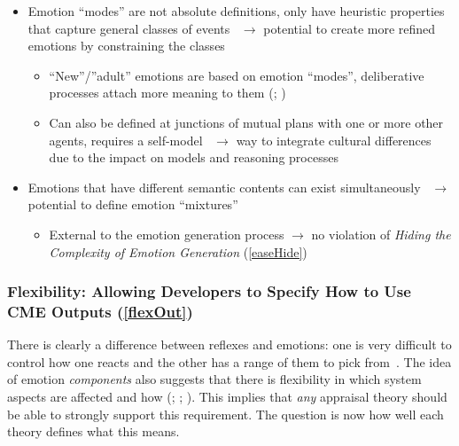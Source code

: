 \begin{itemize}
\begin{itemize}
        \item Emotion ``modes'' are not absolute definitions, only have
        heuristic properties that capture general classes of
        events~\citep[p.~87]{oatley2000sentiments} $\rightarrow$ potential to
        create more refined emotions by constraining the classes
        \begin{itemize}
            \item ``New''/''adult'' emotions are based on emotion ``modes'',
            deliberative processes attach more meaning to them
            (;
            )

            \item Can also be defined at junctions of mutual plans with one or
            more other agents, requires a self-model~\citep[p.~44, 46,
            48]{oatley1987towards} $\rightarrow$ way to integrate cultural
            differences due to the impact on models and reasoning
            processes~\citep[p.~47]{oatley1987towards}
        \end{itemize}

        \item Emotions that have different semantic contents can exist
        simultaneously~\citep[p.~104]{oatley1992best} $\rightarrow$ potential
        to define emotion ``mixtures''
        \begin{itemize}
            \item External to the emotion generation process $\rightarrow$ no
            violation of \textit{Hiding the Complexity of Emotion Generation}
            (\ref{easeHide})
        \end{itemize}
    \end{itemize}
\end{itemize}

\subsubsection{Flexibility: Allowing Developers to Specify How to Use CME
Outputs
    (\ref{flexOut})}
There is clearly a difference between reflexes and emotions: one is very
difficult to control how one reacts and the other has a range of them to pick
from~\citep[p.~45]{fellous2004human}. The idea of emotion \textit{components}
also suggests that there is flexibility in which system aspects are affected
and how (;
; ). This
implies that \textit{any} appraisal theory should be able to strongly support
this requirement. The question is now how well each theory defines what this
means.

